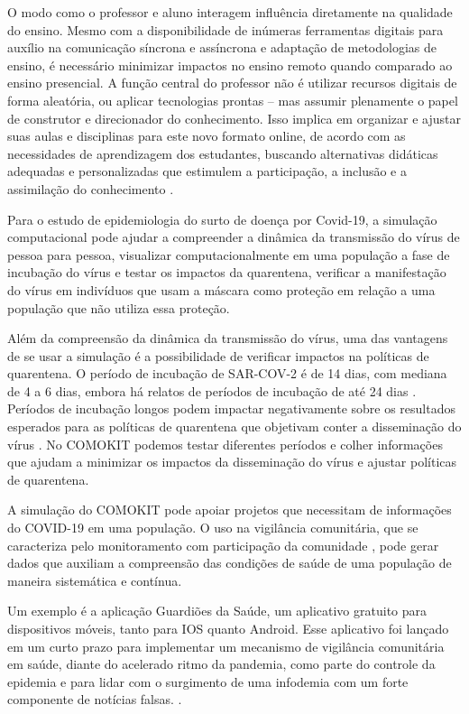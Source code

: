 O modo como o professor e aluno interagem influência diretamente na qualidade do ensino. Mesmo com a disponibilidade de inúmeras ferramentas digitais para auxílio na comunicação síncrona e assíncrona e adaptação de metodologias de ensino, é necessário minimizar impactos no ensino remoto quando comparado ao ensino presencial. A função central do professor não é utilizar recursos digitais de forma aleatória, ou aplicar tecnologias prontas – mas assumir plenamente o papel de construtor e direcionador do conhecimento. Isso implica em organizar e ajustar suas aulas e disciplinas para este novo formato online, de acordo com as necessidades de aprendizagem dos estudantes, buscando alternativas didáticas adequadas e personalizadas que estimulem a participação, a inclusão e a assimilação do conhecimento \cite{santos2021covid}.

Para o estudo de epidemiologia do surto de doença por Covid-19, a simulação computacional pode ajudar a compreender a dinâmica da transmissão do vírus de pessoa para pessoa, visualizar computacionalmente em uma população a fase de incubação do vírus e testar os impactos da quarentena, verificar a manifestação do vírus em indivíduos que usam a máscara como proteção em relação a uma população que não utiliza essa proteção.

Além da compreensão da dinâmica da transmissão do vírus, uma das vantagens de se usar a simulação é a possibilidade de verificar impactos na políticas de quarentena. O período de incubação de SAR-COV-2 é de 14 dias, com mediana de 4 a 6 dias, embora há relatos de períodos de incubação de até 24 dias \cite{kang2020impact}. Períodos de incubação longos podem impactar negativamente sobre os resultados esperados para as políticas de quarentena que objetivam conter a disseminação do vírus \cite{netto2020epidemiologia}. No COMOKIT podemos testar diferentes períodos e colher informações que ajudam a minimizar os impactos da disseminação do vírus e ajustar políticas de quarentena.

A simulação do COMOKIT pode apoiar projetos que necessitam de informações do COVID-19 em uma população. O uso na vigilância comunitária, que se caracteriza pelo monitoramento com participação da comunidade \cite{oliveira2021equipe}, pode gerar dados que auxiliam a compreensão das condições de saúde de uma população de maneira sistemática e contínua.

Um exemplo é a aplicação Guardiões da Saúde, um aplicativo gratuito para dispositivos móveis, tanto para IOS quanto Android. Esse aplicativo foi lançado em um curto prazo para implementar um mecanismo de vigilância comunitária em saúde, diante do acelerado ritmo da pandemia, como parte do controle da epidemia e para lidar com o surgimento de uma infodemia com um forte componente de notícias falsas. \cite{oliveira2021equipe}.

